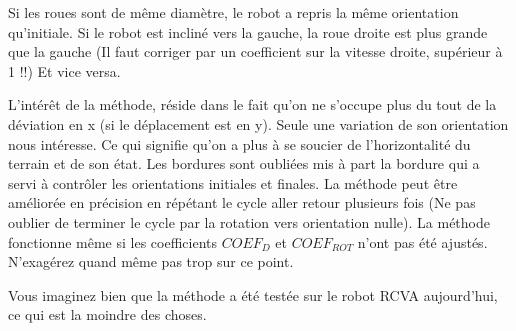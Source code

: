 \documentclass[a4paper]{report}
\begin{document}
Si les roues sont de même diamètre, le robot a repris la même orientation qu’initiale.
Si le robot est incliné vers la gauche, la roue droite est plus grande que la gauche
(Il faut corriger par un coefficient sur la vitesse droite, supérieur à 1 !!)
Et vice versa.

L’intérêt de la méthode, réside dans le fait qu’on ne s’occupe plus du tout de la déviation en x (si le déplacement est en y). Seule une variation de son orientation nous intéresse. Ce qui signifie qu’on a plus à se soucier de l’horizontalité du terrain et de son état. Les bordures sont oubliées mis à part la bordure qui a servi à contrôler les orientations initiales et finales. 
La méthode peut être améliorée en précision en répétant le cycle aller retour plusieurs fois (Ne pas oublier de terminer le cycle par la rotation vers orientation nulle).
La méthode fonctionne même si les coefficients ${COEF}_D$ et ${COEF}_{ROT}$ n’ont pas été ajustés. N’exagérez quand même pas trop sur ce point.

Vous imaginez bien que la méthode a été testée sur le robot RCVA aujourd’hui, ce qui est la moindre des choses.
\end{document}
